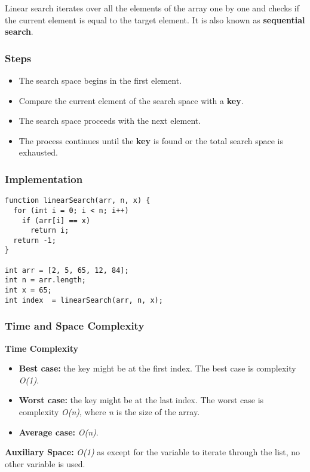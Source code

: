 Linear search iterates over all the elements of the array one by one and checks if the current element is equal to the target element. It is also known as \textbf{sequential search}.

\subsubsection{Steps}

\begin{itemize}
  \item The search space begins in the first element.
  \item Compare the current element of the search space with a \textbf{key}.
  \item The search space proceeds with the next element.
  \item The process continues until the \textbf{key} is found or the total search space is exhausted.
\end{itemize}

\subsubsection{Implementation}

\begin{lstlisting}[style=general]
function linearSearch(arr, n, x) {
  for (int i = 0; i < n; i++)
    if (arr[i] == x)
      return i;
  return -1;
}

int arr = [2, 5, 65, 12, 84];
int n = arr.length;
int x = 65;
int index  = linearSearch(arr, n, x);
\end{lstlisting}

\subsubsection{Time and Space Complexity}

\textbf{Time Complexity}

\begin{itemize}
  \item \textbf{Best case:} the key might be at the first index. The best case is complexity \emph{O(1)}.
  \item \textbf{Worst case:} the key might be at the last index. The worst case is complexity \emph{O(n)}, where \textit{n} is the size of the array.
  \item \textbf{Average case:} \emph{O(n)}.
\end{itemize}

\textbf{Auxiliary Space:} \textit{O(1)} as except for the variable to iterate through the list, no other variable is used.

